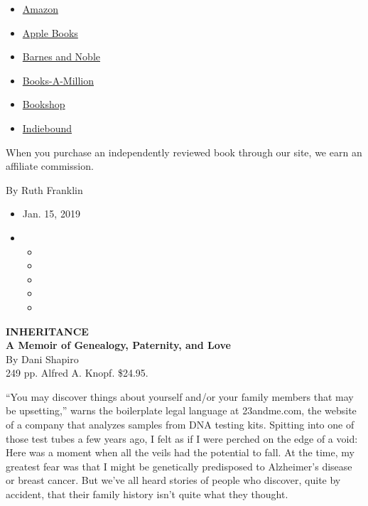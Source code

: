 \begin{itemize}
\tightlist
\item
  \href{https://www.amazon.com/gp/search?index=books\&tag=NYTBSREV-20\&field-keywords=Inheritance\%3A+A+Memoir+of+Genealogy\%2C+Paternity\%2C+and+Love+Dani+Shapiro}{Amazon}
\item
  \href{https://du-gae-books-dot-nyt-du-prd.appspot.com/buy?title=Inheritance\%3A+A+Memoir+of+Genealogy\%2C+Paternity\%2C+and+Love\&author=Dani+Shapiro}{Apple
  Books}
\item
  \href{https://www.anrdoezrs.net/click-7990613-11819508?url=https\%3A\%2F\%2Fwww.barnesandnoble.com\%2Fw\%2F\%3Fean\%3D9781524732714}{Barnes
  and Noble}
\item
  \href{https://www.anrdoezrs.net/click-7990613-35140?url=https\%3A\%2F\%2Fwww.booksamillion.com\%2Fp\%2FInheritance\%253A\%2BA\%2BMemoir\%2Bof\%2BGenealogy\%252C\%2BPaternity\%252C\%2Band\%2BLove\%2FDani\%2BShapiro\%2F9781524732714}{Books-A-Million}
\item
  \href{https://bookshop.org/a/3546/9781524732714}{Bookshop}
\item
  \href{https://www.indiebound.org/book/9781524732714?aff=NYT}{Indiebound}
\end{itemize}

When you purchase an independently reviewed book through our site, we
earn an affiliate commission.

By Ruth Franklin

\begin{itemize}
\item
  Jan. 15, 2019
\item
  \begin{itemize}
  \item
  \item
  \item
  \item
  \item
  \end{itemize}
\end{itemize}

\textbf{INHERITANCE}\\
\textbf{A Memoir of Genealogy, Paternity, and Love}\\
By Dani Shapiro\\
249 pp. Alfred A. Knopf. \$24.95.

``You may discover things about yourself and/or your family members that
may be upsetting,'' warns the boilerplate legal language at 23andme.com,
the website of a company that analyzes samples from DNA testing kits.
Spitting into one of those test tubes a few years ago, I felt as if I
were perched on the edge of a void: Here was a moment when all the veils
had the potential to fall. At the time, my greatest fear was that I
might be genetically predisposed to Alzheimer's disease or breast
cancer. But we've all heard stories of people who discover, quite by
accident, that their family history isn't quite what they thought.

